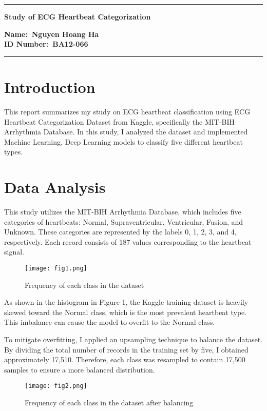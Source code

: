 \documentclass[11pt,a4paper,twoside]{article}
\begin{document}
\begin{center}
\hrule

\vspace{.4cm}
{\bf {\Huge Study of ECG Heartbeat Categorization}}
\vspace{.2cm}
\end{center}
{\bf Name:\ Nguyen Hoang Ha }  \\
{\bf ID Number:\ BA12-066}  \\
\hrule


\section{Introduction}
This report summarizes my study on ECG heartbeat classification using ECG Heartbeat Categorization Dataset from Kaggle, specifically the MIT-BIH Arrhythmia Database. In this study, I analyzed the dataset and implemented Machine Learning, Deep Learning models to classify five different heartbeat types. 

\section{Data Analysis}
This study utilizes the MIT-BIH Arrhythmia Database, which includes five categories of heartbeats: Normal, Supraventricular, Ventricular, Fusion, and Unknown. These categories are represented by the labels 0, 1, 2, 3, and 4, respectively. Each record consists of 187 values corresponding to the heartbeat signal.

\begin{figure}[!h]
    \centering
    \texttt{[image: fig1.png]}
    \caption{Frequency of each class in the dataset}
    \label{f1}
\end{figure}

As shown in the histogram in Figure 1, the Kaggle training dataset is heavily skewed toward the Normal class, which is the most prevalent heartbeat type. This imbalance can cause the model to overfit to the Normal class.

To mitigate overfitting, I applied an upsampling technique to balance the dataset. By dividing the total number of records in the training set by five, I obtained approximately 17,510. Therefore, each class was resampled to contain 17,500 samples to ensure a more balanced distribution.


\begin{figure}[!h]
	\centering
	\texttt{[image: fig2.png]}
	\caption{Frequency of each class in the dataset after balancing}
	\label{f2}
\end{figure}
\end{document}
